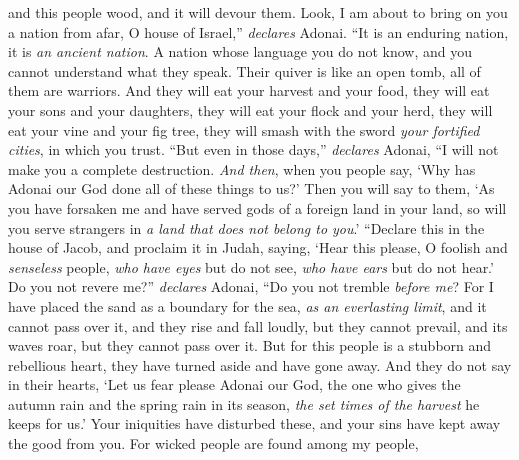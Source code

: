 \begin{biblechapter}
and this people wood, and it will devour them.
\verse Look, I am about to bring on you a nation from afar, 
O house of Israel,” \textit{declares} Adonai. 
“It is an enduring nation, it is \textit{an ancient nation}. 
A nation whose language you do not know, 
and you cannot understand what they speak.
\verse Their quiver is like an open tomb, 
all of them are warriors.
\verse And they will eat your harvest and your food, 
they will eat your sons and your daughters, 
they will eat your flock and your herd, 
they will eat your vine and your fig tree, 
they will smash with the sword \textit{your fortified cities}, 
in which you trust.
\verse “But even in those days,” \textit{declares} Adonai, “I will not make you a complete destruction.
\verse \textit{And then}, when you people say, ‘Why has Adonai our God done all of these things to us?’ Then you will say to them, ‘As you have forsaken me and have served gods of a foreign land in your land, so will you serve strangers in \textit{a land that does not belong to you}.’
\verse “Declare this in the house of Jacob, 
and proclaim it in Judah, saying,
\verse ‘Hear this please, O foolish and \textit{senseless} people, 
\textit{who have eyes} but do not see, 
\textit{who have ears} but do not hear.’
\verse Do you not revere me?” \textit{declares} Adonai, 
“Do you not tremble \textit{before me}? 
For I have placed the sand as a boundary for the sea, 
\textit{as an everlasting limit}, and it cannot pass over it, 
and they rise and fall loudly, but they cannot prevail, 
and its waves roar, but they cannot pass over it.
\verse But for this people is a stubborn and rebellious heart, 
they have turned aside and have gone away.
\verse And they do not say in their hearts, 
‘Let us fear please Adonai our God, 
the one who gives the autumn rain and the spring rain in its season, 
\textit{the set times of the harvest} he keeps for us.’
\verse Your iniquities have disturbed these, 
and your sins have kept away the good from you.
\verse For wicked people are found among my people, 

\end{biblechapter}
